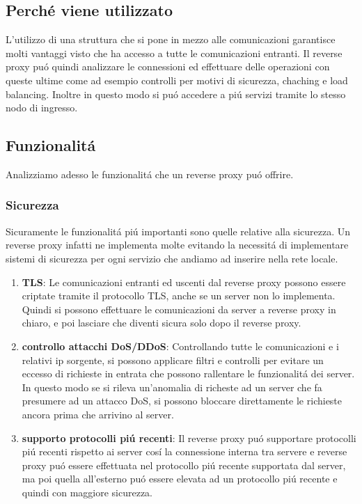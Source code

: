 \subsection{Perché viene utilizzato}
L'utilizzo di una struttura che si pone in mezzo alle comunicazioni garantisce molti vantaggi visto che ha accesso a tutte le comunicazioni entranti. Il reverse proxy puó quindi analizzare le connessioni ed effettuare delle operazioni con queste ultime come ad esempio controlli per motivi di sicurezza, chaching e load balancing. Inoltre in questo modo si puó accedere a piú servizi tramite lo stesso nodo di ingresso.

\subsection{Funzionalitá}
Analizziamo adesso le funzionalitá che un reverse proxy puó offrire.

\subsubsection{Sicurezza}
Sicuramente le funzionalitá piú importanti sono quelle relative alla sicurezza. Un reverse proxy infatti ne implementa molte evitando la necessitá di implementare sistemi di sicurezza per ogni servizio che andiamo ad inserire nella rete locale.
\begin{enumerate}
  \item \textbf{TLS}: Le comunicazioni entranti ed uscenti dal reverse proxy possono essere criptate tramite il protocollo TLS, anche se un server non lo implementa. Quindi si possono effettuare le comunicazioni da server a reverse proxy in chiaro, e poi lasciare che diventi sicura solo dopo il reverse proxy.
  \item \textbf{controllo attacchi DoS/DDoS}: Controllando tutte le comunicazioni e i relativi ip sorgente, si possono applicare filtri e controlli per evitare un eccesso di richieste in entrata che possono rallentare le funzionalitá dei server. In questo modo se si rileva un'anomalia di richeste ad un server che fa presumere ad un attacco DoS, si possono bloccare direttamente le richieste ancora prima che arrivino al server.
  \item \textbf{supporto protocolli piú recenti}: Il reverse proxy puó supportare protocolli piú recenti rispetto ai server cosí la connessione interna tra servere e reverse proxy puó essere effettuata nel protocollo piú recente supportata dal server, ma poi quella all'esterno puó essere elevata ad un protocollo piú recente e quindi con maggiore sicurezza.

\end{enumerate}

